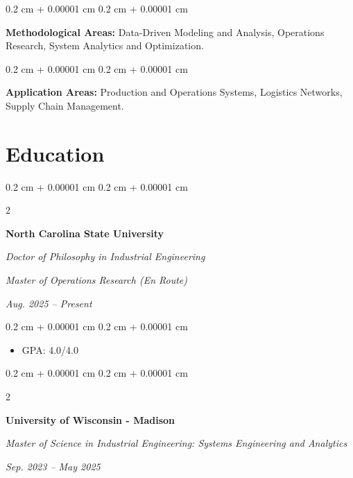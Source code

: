 \documentclass[10pt, letterpaper]{article}
\newenvironment{highlights}{
    \begin{itemize}[
        topsep=0.10 cm,
        parsep=0.10 cm,
        partopsep=0pt,
        itemsep=0pt,
        leftmargin=0.4 cm + 10pt
    ]
}{
    \end{itemize}
} %
\newenvironment{onecolentry}{
    \begin{adjustwidth}{
        0.2 cm + 0.00001 cm
    }{
        0.2 cm + 0.00001 cm
    }
}{
    \end{adjustwidth}
} %
\newenvironment{twocolentry}[2][]{
    \onecolentry
    \def\secondColumn{#2}
    \setcolumnwidth{\fill, 4.5 cm}
    \begin{paracol}{2}
}{
    \switchcolumn \raggedleft \secondColumn
    \end{paracol}
    \endonecolentry
} %
\begin{document}
\vspace{0.13 cm}

\begin{onecolentry}
            \textbf{Methodological Areas:} Data-Driven Modeling and Analysis, Operations Research, System Analytics and Optimization. 
        \end{onecolentry}

        \vspace{0.06 cm}

        \begin{onecolentry}
            \textbf{Application Areas:}  Production and Operations Systems, Logistics Networks, Supply Chain Management.
        \end{onecolentry}


        
\section{Education}

\vspace{0.13 cm}

\begin{twocolentry}{
    \textit{Aug. 2025 – Present}}
    \textbf{North Carolina State University}

    \vspace{0.10 cm}
    \textit{Doctor of Philosophy in Industrial Engineering}

    \vspace{0.06 cm}
    \textit{Master of Operations Research (En Route)}
\end{twocolentry}

\vspace{0.10 cm}

\begin{onecolentry}
    \begin{highlights}
        \item GPA: 4.0/4.0
    \end{highlights}
\end{onecolentry}

\vspace{0.13 cm}

\begin{twocolentry}{
    \textit{Sep. 2023 – May 2025}}
    \textbf{University of Wisconsin - Madison}

    \vspace{0.10 cm}
    \textit{Master of Science in Industrial Engineering: Systems Engineering and Analytics}
\end{twocolentry}
\end{document}
